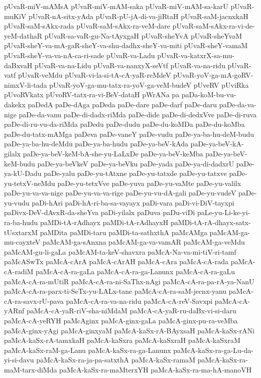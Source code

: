 {pUvaR-miV-mAMsA
pUvaR-miV-mAM-saka
pUvaR-miV-mAM-sa-karU
pUvaR-muKiV
pUvaR-nA-sitx-yAda
pUvaR-pU-jA-di-va-jiRtaH
pUvaR-saM-jacnxkaH
pUvaR-saM-sAkx-rada
pUvaR-saM-sAkx-ra-veM-dare
pUvaR-saM-sAkx-ra-vi-de-yeM-dathaR
pUvaR-sa-vaR-gu-Na-tAyxgaH
pUvaR-sheYvA
pUvaR-sheYvaM
pUvaR-sheY-va-mA-gaR-sheY-va-shu-dadhx-sheY-va-miti
pUvaR-sheY-vamaM
pUvaR-sheY-va-va-nA-ca-ri-sade
pUvaR-va-Ladu
pUvaR-va-katxrX-sa-mu-daBxvaH
pUvaR-va-na-Lidu
pUvaR-va-nanxyX-seVtf
pUvaR-va-na-ridu
pUvaR-vatf
pUvaR-veMdu
pUvaR-vi-la-si-tA-cA-yaR-reMdeV
pUvaR-yoV-ga-mA-goRV-nimxV-li-tada
pUvaR-yoV-ga-mu-tatx-ra-yoV-ga-veM-budeV
pUveRV
pUviRka
pUvoRVkatx
pUvoRV-tatx-ra-vi-BeV-dataH
pWrANa
pa
paDa-koM-bu-vu-dakekx
paDedA
paDe-dAga
paDeda
paDe-dare
paDe-darf
paDe-daru
paDe-da-va-nige
paDe-da-vanu
paDe-di-dadx-riMda
paDe-dide
paDe-di-dedxVve
paDe-di-ruva
paDe-di-ru-vu-da-riMda
paDedu
paDe-dudu
paDe-du-koMDa
paDe-du-koMba
paDe-du-tatx-mAMga
paDeva
paDe-vaneY
paDe-vudu
paDe-ya-ba-hu-deM-budu
paDe-ya-ba-hu-deMdu
paDe-ya-ba-hudu
paDe-ya-beV-kAda
paDe-ya-beV-kA-gilalx
paDe-ya-beV-keM-bA-she-yu-LaLxDe
paDe-ya-beV-keMba
paDe-ya-beV-keM-budu
paDe-ya-beVkeV
paDe-ya-beVku
paDe-yada
paDe-ya-di-dadxrU
paDe-ya-kU-Dadu
paDe-yalu
paDe-yu-tAtxne
paDe-yu-tatxde
paDe-yu-tatxve
paDe-yu-tetxV-neMdu
paDe-yu-tetxVve
paDe-yuva
paDe-yu-vaMte
paDe-yu-valilx
paDe-yu-va-va-nige
paDe-yu-va-va-rige
paDe-yu-vu-dA-gali
paDe-yu-vudeV
paDe-yu-vudu
paDi-hAri
paDi-hA-ri-ba-sa-vayayx
paDi-vara
paDi-vi-DiV-tayxpi
paDivx-DeV-dAvxR-da-sheYva
paDi-yilalx
paDuva
paDu-viDi
paLe-yu-Li-ke-yi-ra-ba-hudu
paMDi-tA-rAdhayx
paMDi-tA-rAdhayxH
paMDi-tA-rA-dhayx-satx-tUsxtarxM
paMDita
paMDi-taru
paMDi-ta-sathxthA
paMcAMga
paMcAM-ga-mu-cayxteV
paMcAM-ga-sAnxna
paMcAM-ga-va-vamAR
paMcAM-ga-veMdu
paMcAM-gu-li-gaLa
paMcAM-ta-keV-shavxra
paMcA-Na-va-mi-tiV-ri-tamf
paMcASwTx
paMcA-cArA
paMcA-cArAH
paMcA-cAra
paMcA-cA-rada
paMcA-cA-radiM
paMcA-cA-ra-gaLa
paMcA-cA-ra-ga-Lanunx
paMcA-cA-ra-gaLu
paMcA-cA-ra-mUtiR
paMcA-cA-ra-ni-SaThx-nAgi
paMcA-cA-ra-pa-rA-ya-NanU
paMcA-cA-ra-parx-ti-SeTx-yu-LALx-tane
paMcA-cA-ra-saM-jecnx-yanu
paMcA-cA-ra-savx-rU-pava
paMcA-cA-ra-va-na-ridu
paMcA-cA-reV-Savxpi
paMcA-cA-yARnf
paMcA-cA-yaR-riV-sha-niMdaM
paMcA-cA-yaR-ru-daBx-vi-si-daru
paMcA-cA-yeRYH
paMcAginx
paMcA-ginx-gaLa
paMcA-ginx-pu-ra-veMba
paMcA-ginx-yAgi
paMcA-ginxyaM
paMcA-kaSx-rA-BAyxsaH
paMcA-kaSx-rANi
paMcA-kaSx-rA-tamxkaH
paMcA-kaSxra
paMcA-kaSxraH
paMcA-kaSxraM
paMcA-kaSx-raM-ga-Lanu
paMcA-kaSx-ra-ga-Lanunx
paMcA-kaSx-ra-ga-Lu-da-yi-si-davu
paMcA-kaSx-ra-ja-pa-satxthA
paMcA-kaSx-ramaM
paMcA-kaSx-ra-maM-tarx-diMda
paMcA-kaSx-ra-maMterxYH
paMcA-kaSx-ra-ma-hA-manoVH
}
